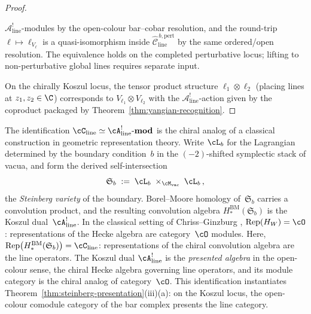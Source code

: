 \begin{proof}
\begin{itemize}
$\mathcal{A}^!_{\mathrm{line}}$-modules by the open-colour bar--cobar
resolution, and the round-trip $\ell \mapsto \ell_{V_\ell}$ is a
quasi-isomorphism inside
$\widehat{\mathcal{C}}^{\,b,\mathrm{pert}}_{\mathrm{line}}$ by the
same ordered/open resolution. The equivalence holds on the
completed perturbative locus; lifting to non-perturbative global
lines requires separate input.
\end{itemize}
On the chirally Koszul locus, the tensor product structure
$\ell_1 \otimes \ell_2$ (placing lines at $z_1, z_2 \in \C$)
corresponds to $V_{\ell_1} \otimes V_{\ell_2}$ with the
$\mathcal{A}^!_{\mathrm{line}}$-action given by the coproduct
packaged by Theorem~\ref{thm:yangian-recognition}.
\end{proof}

\begin{remark}
\label{rem:steinberg-self-intersection}
The identification
$\cC_{\mathrm{line}} \simeq \cA^!_{\mathrm{line}}\text{-}\mathbf{mod}$
is the chiral analog of a classical construction in geometric
representation theory. Write $\cL_b$ for the Lagrangian
determined by the boundary condition~$b$ in the $(-2)$-shifted
symplectic stack of vacua, and form the derived
self-intersection
\[
 \mathfrak{S}_b
 \;:=\;
 \cL_b \;\times_{\cM_{\mathrm{vac}}}\; \cL_b\,,
\]
the \emph{Steinberg variety} of the boundary.
Borel--Moore homology of~$\mathfrak{S}_b$ carries a
convolution product, and the resulting convolution algebra
$H_*^{\mathrm{BM}}(\mathfrak{S}_b)$ is the Koszul
dual~$\cA^!_{\mathrm{line}}$. In the classical setting of Chriss--Ginzburg
\cite{CG97}, $\operatorname{Rep}(H_W) = \cO$: representations
of the Hecke algebra are category~$\cO$ modules. Here,
$\operatorname{Rep}\bigl(H_*^{\mathrm{BM}}(\mathfrak{S}_b)
\bigr) = \cC_{\mathrm{line}}$: representations of the
chiral convolution algebra are the line operators.
The Koszul dual $\cA^!_{\mathrm{line}}$ is the \emph{presented algebra}
in the open-colour sense, the chiral Hecke algebra governing
line operators, and its module category is
the chiral analog of category~$\cO$.
This identification instantiates
Theorem~\ref{thm:steinberg-presentation}(iii)(a): on the Koszul
locus, the open-colour comodule category of the bar complex
presents the line category.
\end{remark}

